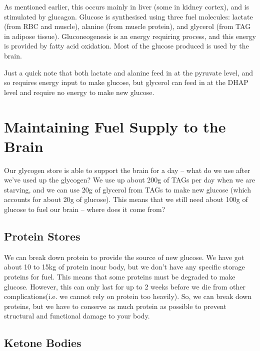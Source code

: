 As mentioned earlier, this occurs mainly in liver (some in kidney cortex), and is stimulated by glucagon.
Glucose is synthesised using three fuel molecules: lactate (from RBC and muscle), alanine (from muscle protein), and glycerol (from TAG in adipose tissue).
Gluconeogenesis is an energy requiring process, and this energy is provided by fatty acid oxidation.
Most of the glucose produced is used by the brain.

\begin{center}
\end{center}

Just a quick note that both lactate and alanine feed in at the pyruvate level, and so requires energy input to make glucose, but glycerol can feed in at the DHAP level and require no energy to make new glucose.

\section{Maintaining Fuel Supply to the Brain}

Our glycogen store is able to support the brain for a day -- what do we use after we've used up the glycogen?
We use up about 200g of TAGs per day when we are starving, and we can use 20g of glycerol from TAGs to make new glucose (which accounts for about 20g of glucose).
This means that we still need about 100g of glucose to fuel our brain -- where does it come from?

\subsection{Protein Stores}

We can break down protein to provide the source of new glucose.
We have got about 10 to 15kg of protein inour body, but we don't have any specific storage proteins for fuel.
This means that some proteins must be degraded to make glucose.
However, this can only last for up to 2 weeks before we die from other complications(i.e. we cannot rely on protein too heavily).
So, we can break down proteins, but we have to conserve as much protein as possible to prevent structural and functional damage to your body.

\subsection{Ketone Bodies}

\begin{center}
\end{center}

